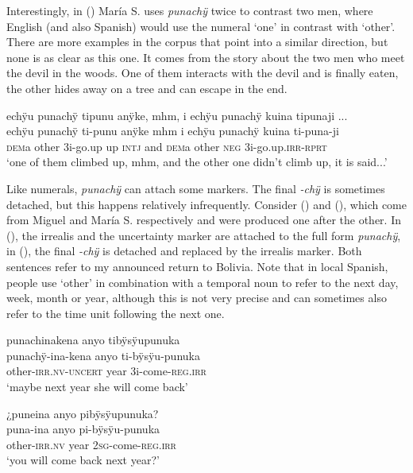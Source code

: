 Interestingly, in () María S. uses \textit{punachÿ} twice to contrast two men, where English (and also Spanish) would use the numeral ‘one’ in contrast with ‘other’. There are more examples in the corpus that point into a similar direction, but none is as clear as this one. It comes from the story about the two men who meet the devil in the woods. One of them interacts with the devil and is finally eaten, the other hides away on a tree and can escape in the end.

\ea\label{ex:other-3}
\begingl
\glpreamble echÿu punachÿ tipunu anÿke, mhm, i echÿu punachÿ kuina tipunaji ...\\
\gla echÿu punachÿ ti-punu anÿke mhm i echÿu punachÿ kuina ti-puna-ji\\
\glb \textsc{dem}a other 3i-go.up up \textsc{intj} and \textsc{dem}a other \textsc{neg} 3i-go.up.\textsc{irr}-\textsc{rprt}\\
\glft ‘one of them climbed up, mhm, and the other one didn’t climb up, it is said...’
\endgl
\trailingcitation{[rxx-n120511l-2.32-35]}
\xe


Like numerals, \textit{punachÿ} can attach some markers. The final \textit{-chÿ} is sometimes detached, but this happens relatively infrequently. Consider  () and (), which come from Miguel and María S. respectively and were produced one after the other. In (), the irrealis and the uncertainty marker are attached to the full form \textit{punachÿ}, in (), the final \textit{-chÿ} is detached and replaced by the irrealis marker. Both sentences refer to my announced return to Bolivia. Note that in local Spanish, people use ‘other’ in combination with a temporal noun to refer to the next day, week, month or year, although this is not very precise and can sometimes also refer to the time unit following the next one.

\ea\label{ex:other-4}
\begingl
\glpreamble punachinakena anyo tibÿsÿupunuka\\
\gla punachÿ-ina-kena anyo ti-bÿsÿu-punuka\\
\glb other-\textsc{irr.nv}-\textsc{uncert} year 3i-come-\textsc{reg.irr}\\
\glft ‘maybe next year she will come back’
\endgl
\trailingcitation{[mrx-c120509l.125]}
\xe

\ea\label{ex:other-5}
\begingl
\glpreamble ¿puneina anyo pibÿsÿupunuka?\\
\gla puna-ina anyo pi-bÿsÿu-punuka\\
\glb other-\textsc{irr.nv} year 2\textsc{sg}-come-\textsc{reg.irr}\\
\glft ‘you will come back next year?’
\endgl
\trailingcitation{[mrx-c120509l.126]}
\xe


